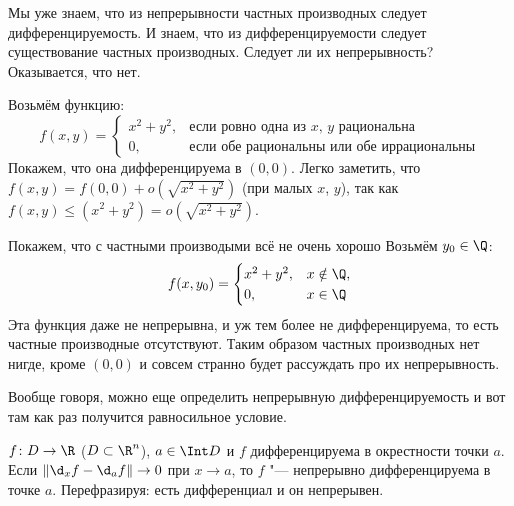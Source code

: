 \begin{exmp}
	Мы уже знаем, что из непрерывности частных производных следует дифференцируемость.
	И знаем, что из дифференцируемости следует существование частных производных.
	Следует ли их непрерывность?
	Оказывается, что нет.

	Возьмём функцию:
	\[
	f(x, y) =
		\begin{cases}
			x^2 + y^2, & \text{если ровно одна из $x$, $y$ рациональна} \\
			0, & \text{если обе рациональны или обе иррациональны}
		\end{cases}
	\]
	Покажем, что она дифференцируема в $(0, 0)$.
	Легко заметить, что $f(x, y) = f(0, 0) + o(\sqrt{x^2+y^2})$ (при малых $x$, $y$),
	так как $f(x, y) \le (x^2 + y^2) = o(\sqrt{x^2+y^2})$.

	Покажем, что с частными производыми всё не очень хорошо
	Возьмём $y_0 \in \Q$:
	\[
		f(x, y_0) =
			\begin{cases}
				x^2 + y^2, & x \notin \Q, \\
				0, & x \in \Q
			\end{cases}
	\]
	Эта функция даже не непрерывна, и уж тем более не дифференцируема, то есть частные производные отсутствуют.
	Таким образом частных производных нет нигде, кроме $(0, 0)$ и совсем странно будет рассуждать про их непрерывность.
\end{exmp}
\begin{Rem}
	Вообще говоря, можно еще определить непрерывную дифференцируемость и вот там как раз получится равносильное условие.
\end{Rem}

\begin{Def}
	$f\colon D \to \R$ ($D \subset \R^n$), $a \in \Int D$ и $f$ дифференцируема в окрестности точки $a$.
	Если $\|\d_x f - \d_a f\| \to 0$ при $x \to a$, то $f$ "--- непрерывно дифференцируема в точке $a$.
	Перефразируя: есть дифференциал и он непрерывен.
\end{Def}

